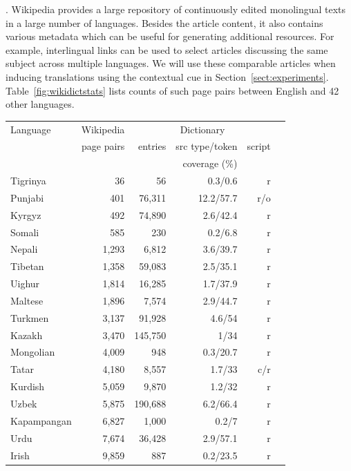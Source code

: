 \documentclass{article}
\newcommand{\secref}[1]{Section~\ref{#1}}
\newcommand{\tabref}[1]{Table~\ref{#1}}
\begin{document}
. Wikipedia provides a large repository of continuously edited monolingual texts in a large number of languages.  Besides the article content, it also contains various metadata which can be useful for generating additional resources.  For example,
interlingual links can be used to select articles discussing the same subject across multiple languages.  We will use these comparable articles when inducing translations using the contextual cue in \secref{sect:experiments}.  \tabref{fig:wikidictstats} lists counts of such page pairs between English and 42 other languages.\\
 
\begin{table}[h!]
\footnotesize
\begin{center}
\begin{tabular}{lrrrrr}
Language		&	Wikipedia	&	\multicolumn{3}{c}{Dictionary}\\
\cline{3-5}
	&	page pairs	&	entries	&	src type/token	&	script \\
	&	&	&	coverage (\%) \\
\hline
Tigrinya	&	36	&	56	&	0.3/0.6	&	r\\
Punjabi 	&	401	&	76,311	&	12.2/57.7	&	r/o\\ 	
Kyrgyz	&	492	&	74,890	&	2.6/42.4	&	r\\
Somali 	&	585	&	230	&	0.2/6.8	&	r\\ 	
Nepali 	&	1,293	&	6,812	&	3.6/39.7	&	r\\
Tibetan	&	1,358	&	59,083	&	2.5/35.1	&	r\\
Uighur	&	1,814	&	16,285	&	1.7/37.9	&	r\\
Maltese 	&	1,896	&	7,574	&	2.9/44.7	&	r\\
Turkmen	&	3,137	&	91,928	&	4.6/54	&	r\\
Kazakh 	&	3,470	&	145,750	&	1/34	&	r\\
Mongolian 	&	4,009	&	948	&	0.3/20.7	&	r\\
Tatar		&	4,180	& 8,557	&	1.7/33	&	c/r\\
Kurdish	&	5,059	&	9,870	&	1.2/32	&	r\\
Uzbek 	&	5,875	&	190,688	&	6.2/66.4	&	r\\
Kapampangan	&	6,827	&	1,000	&	0.2/7	&	r\\
Urdu 	&	7,674	&	36,428	&	2.9/57.1	&	r\\
Irish	&	9,859	&	887&	0.2/23.5	&	r\\

\end{tabular}
\end{center}
\end{table}
\end{document}
